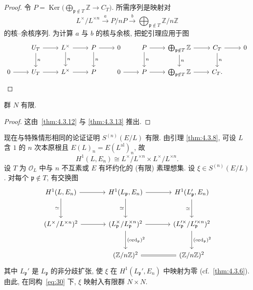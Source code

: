 \begin{proof}
令 $P = \operatorname{Ker}\bigl(\bigoplus_{\mathfrak{p}\notin T}\mathbb{Z}\to C_T\bigr)$. 所需序列是映射对
\[
L^{\times}/L^{\times n}\xrightarrow{a}P/nP\xrightarrow{b}\bigoplus_{\mathfrak{p}\notin T}\mathbb{Z}/n\mathbb{Z}
\]
的核--余核序列. 为计算 $a$ 与 $b$ 的核与余核, 把蛇引理应用于图
\[\begin{tikzcd}
	& {U_T} & {L^\times} & P & 0 & P & {\bigoplus_{\mathfrak{p}\notin T}\Z} & {C_T} & 0 \\
	0 & {U_T} & {L^\times} & P & 0 & P & {\bigoplus_{\mathfrak{p}\notin T}\Z} & {C_T}.
	\arrow[from=1-2, to=1-3]
	\arrow["n", from=1-2, to=2-2]
	\arrow[from=1-3, to=1-4]
	\arrow["n", from=1-3, to=2-3]
	\arrow[from=1-4, to=1-5]
	\arrow["n", from=1-4, to=2-4]
	\arrow[from=1-6, to=1-7]
	\arrow["n", from=1-6, to=2-6]
	\arrow[from=1-7, to=1-8]
	\arrow["n", from=1-7, to=2-7]
	\arrow[from=1-8, to=1-9]
	\arrow["n", from=1-8, to=2-8]
	\arrow[from=2-1, to=2-2]
	\arrow[from=2-2, to=2-3]
	\arrow[from=2-3, to=2-4]
	\arrow[from=2-5, to=2-6]
	\arrow[from=2-6, to=2-7]
	\arrow[from=2-7, to=2-8]
\end{tikzcd}\]
\end{proof}

\begin{corollary} \label{thm:4.3.14} 
群 $N$ 有限.
\end{corollary}

\begin{proof}
这由~\ref{thm:4.3.12} 与 \ref{thm:4.3.13} 推出.
\end{proof}

现在与特殊情形相同的论证证明 $S^{(n)}(E/L)$ 有限. 由引理 \ref{thm:4.3.8}, 可设 $L$ 含 $1$ 的 $n$ 次本原根且 $E(L)_n = E(L^{\mathrm{al}})_n$, 故
\begin{equation} \label{eq:30}
H^1(L, E_n)\cong L^{\times}/L^{\times n}\times L^{\times}/L^{\times n}.
\tag{30}
\end{equation}
设 $T$ 为 $\mathcal{O}_L$ 中与 $n$ 不互素或 $E$ 有坏约化的 (有限) 素理想集. 设 $\xi\in S^{(n)}(E/L)$. 对每个 $\mathfrak{p}\notin T$, 有交换图
\[\begin{tikzcd}[row sep=large, column sep=large]
    H^1(L, E_n) \arrow[r] \arrow[d, "\simeq"'] & 
    H^1(L_{\mathfrak{p}}, E_n) \arrow[r] \arrow[d, "\simeq"'] & 
    H^1(L'_{\mathfrak{p}}, E_n) \arrow[d, "\simeq"'] \\
    (L^\times/L^{\times n})^2 \arrow[r] & 
    (L_{\mathfrak{p}}^\times/L_{\mathfrak{p}}^{\times n})^2 \arrow[r] \arrow[d, "(\text{ord}_{\mathfrak{p}})^2"] & 
    (L_{\mathfrak{p}}'^\times/L_{\mathfrak{p}}'^{\times n})^2 \arrow[d, "(\text{ord}_{\mathfrak{p}})^2"] \\
    & (\mathbb{Z}/n\mathbb{Z})^2 \arrow[r, equal] & 
    (\mathbb{Z}/n\mathbb{Z})^2
\end{tikzcd}\]
其中 $L_\mathfrak{p}'$ 是 $L_\mathfrak{p}$ 的非分歧扩张, 使 $\xi$ 在 $H^1(L_\mathfrak{p}', E_n)$ 中映射为零 (cf.~\ref{thm:4.3.6}). 由此, 在同构~\eqref{eq:30} 下, $\xi$ 映射入有限群 $N\times N$.

